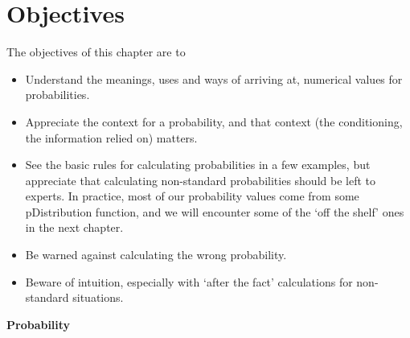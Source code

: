 \documentclass[]{book}
\begin{document}
\hypertarget{objectives}{%
\section{Objectives}\label{objectives}}

The objectives of this chapter are to

\begin{itemize}
\item
  Understand the meanings, uses and ways of arriving at, numerical values for probabilities.
\item
  Appreciate the context for a probability, and that context (the conditioning, the information relied on) matters.
\item
  See the basic rules for calculating probabilities in a few examples, but appreciate that calculating non-standard probabilities should be left to experts. In practice, most of our probability values come from some pDistribution function, and we will encounter some of the `off the shelf' ones in the next chapter.
\item
  Be warned against calculating the wrong probability.
\item
  Beware of intuition, especially with `after the fact' calculations for non-standard situations.
\end{itemize}

\textbf{Probability}
\end{document}
